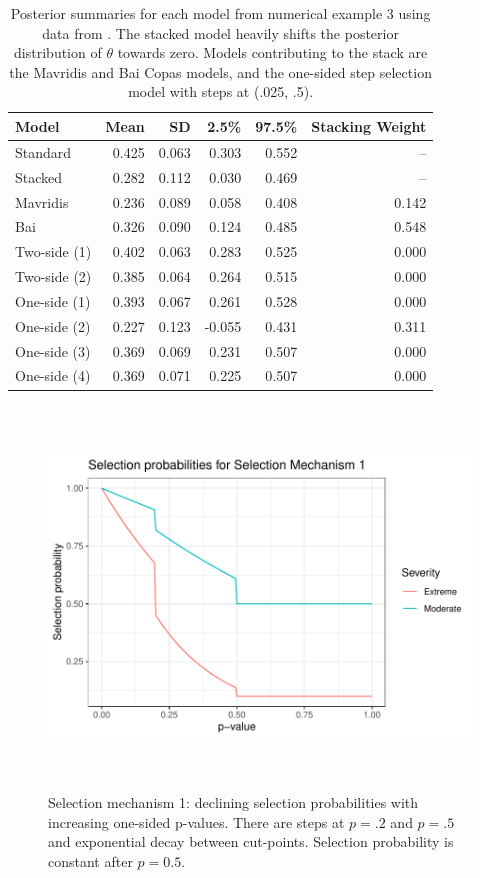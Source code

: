 \documentclass[12pt]{article}   	%
\numberwithin{equation}{section}
\begin{document}
\begin{table}[ht]
\begin{tabular}{lrrrrr}
  \hline
Model & Mean & SD & 2.5\% & 97.5\% & Stacking Weight \\ 
  \hline
Standard & 0.425 & 0.063 & 0.303 & 0.552 & -- \\ 
  Stacked & 0.282 & 0.112 & 0.030 & 0.469 & --  \\ 
  Mavridis & 0.236 & 0.089 & 0.058 & 0.408 & 0.142 \\ 
  Bai & 0.326 & 0.090 & 0.124 & 0.485 & 0.548 \\ 
  Two-side (1) & 0.402 & 0.063 & 0.283 & 0.525 & 0.000 \\ 
  Two-side (2) & 0.385 & 0.064 & 0.264 & 0.515 & 0.000 \\ 
  One-side (1) & 0.393 & 0.067 & 0.261 & 0.528 & 0.000 \\ 
  One-side (2) & 0.227 & 0.123 & -0.055 & 0.431 & 0.311 \\ 
  One-side (3) & 0.369 & 0.069 & 0.231 & 0.507 & 0.000 \\ 
  One-side (4) & 0.369 & 0.071 & 0.225 & 0.507 & 0.000 \\ 
   \hline
\end{tabular}
\caption{Posterior summaries for each model from numerical example 3 using data from \citet{landenberger2005recidivism}. The stacked model heavily shifts the posterior distribution of $\theta$ towards zero. Models contributing to the stack are the Mavridis and Bai Copas models, and the one-sided step selection model with steps at (.025, .5).}
\label{tab:landenberger}
\end{table}




\begin{figure}
\includegraphics[height = 4in, width = 6in]{SM1.pdf}
\caption{Selection mechanism 1: declining selection probabilities with increasing one-sided p-values. There are steps at $p = .2$ and $p=.5$ and exponential decay between cut-points. 
Selection probability is constant after $p=0.5$.}
\label{fig:SM1}
\end{figure}
\end{document}
